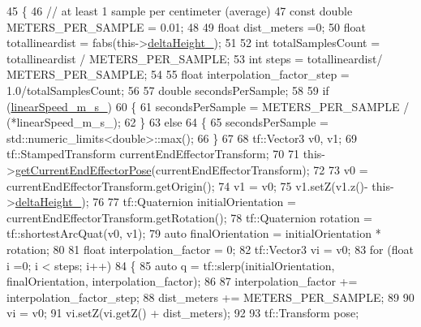 \begin{DoxyCode}
45     \{
46         \textcolor{comment}{// at least 1 sample per centimeter (average)        }
47         \textcolor{keyword}{const} \textcolor{keywordtype}{double} METERS\_PER\_SAMPLE = 0.01;
48 
49         \textcolor{keywordtype}{float} dist\_meters =0;
50         \textcolor{keywordtype}{float} totallineardist = fabs(this->\hyperlink{classcl__move__group__interface_1_1CbCircularPouringMotion_a7009d617bcd8ac1fba49100444434f3c}{deltaHeight\_});
51 
52         \textcolor{keywordtype}{int} totalSamplesCount = totallineardist / METERS\_PER\_SAMPLE;
53         \textcolor{keywordtype}{int} steps = totallineardist/ METERS\_PER\_SAMPLE;
54 
55         \textcolor{keywordtype}{float} interpolation\_factor\_step = 1.0/totalSamplesCount;
56 
57         \textcolor{keywordtype}{double} secondsPerSample;
58 
59         \textcolor{keywordflow}{if} (\hyperlink{classcl__move__group__interface_1_1CbCircularPouringMotion_ac78ce543451cbb78c95862dd4273deb7}{linearSpeed\_m\_s\_})
60         \{
61             secondsPerSample = METERS\_PER\_SAMPLE / (*linearSpeed\_m\_s\_);
62         \}
63         \textcolor{keywordflow}{else}
64         \{
65             secondsPerSample = std::numeric\_limits<double>::max();
66         \}
67 
68         tf::Vector3 v0, v1;
69         tf::StampedTransform currentEndEffectorTransform;
70 
71         this->\hyperlink{classcl__move__group__interface_1_1CbCircularPouringMotion_a0cc72cc5233ecb0c264621d4d9501b30}{getCurrentEndEffectorPose}(currentEndEffectorTransform);
72 
73         v0 = currentEndEffectorTransform.getOrigin();
74         v1 = v0;
75         v1.setZ(v1.z()- this->\hyperlink{classcl__move__group__interface_1_1CbCircularPouringMotion_a7009d617bcd8ac1fba49100444434f3c}{deltaHeight\_});
76 
77         tf::Quaternion initialOrientation = currentEndEffectorTransform.getRotation();
78         tf::Quaternion rotation = tf::shortestArcQuat(v0, v1);
79         \textcolor{keyword}{auto} finalOrientation = initialOrientation * rotation;
80 
81         \textcolor{keywordtype}{float} interpolation\_factor = 0;
82         tf::Vector3 vi = v0;
83         \textcolor{keywordflow}{for} (\textcolor{keywordtype}{float} i =0; i < steps; i++)
84         \{
85             \textcolor{keyword}{auto} q = tf::slerp(initialOrientation, finalOrientation, interpolation\_factor);
86 
87             interpolation\_factor += interpolation\_factor\_step;
88             dist\_meters += METERS\_PER\_SAMPLE;
89 
90             vi = v0;
91             vi.setZ(vi.getZ() + dist\_meters);
92 
93             tf::Transform pose;

\end{DoxyCode}
